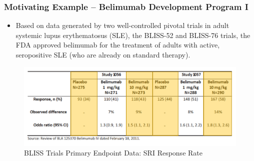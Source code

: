 \documentclass{beamer}
\begin{document}
\begin{frame} \frametitle{Motivating Example -- Belimumab Development Program I}
\begin{itemize}
			\item Based on data generated by two well-controlled pivotal 
						trials in adult systemic lupus erythematosus (SLE), the BLISS-52 and 
						BLISS-76 trials, the FDA approved belimumab for the treatment of adults 
						with active, seropositive SLE (who are already on standard therapy).			
\end{itemize}

\vspace{-0.3cm}
\begin{figure}[h]
	\centering\includegraphics[scale=0.52]{./figures/BLISS.pdf}  
	\vspace{-0.35cm}
	\caption{BLISS Trials Primary Endpoint Data: SRI Response Rate} \label{BLISS_DATA}
\end{figure}	
\end{frame}
%
\end{document}

